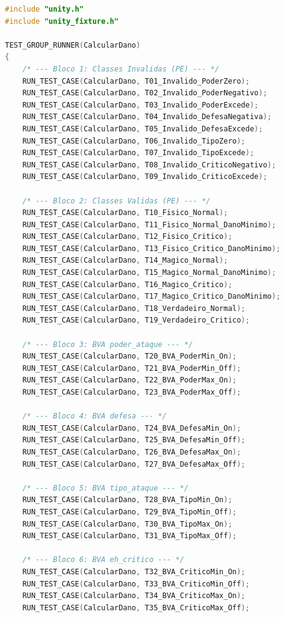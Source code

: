 \documentclass[conference, onecolumn]{IEEEtran}
\begin{document}
\begin{lstlisting}[language=C, caption={TestCalcularDano\_Runner.c --- registra os 47 casos no grupo Unity.}]
#include "unity.h"
#include "unity_fixture.h"

TEST_GROUP_RUNNER(CalcularDano)
{
    /* --- Bloco 1: Classes Invalidas (PE) --- */
    RUN_TEST_CASE(CalcularDano, T01_Invalido_PoderZero);
    RUN_TEST_CASE(CalcularDano, T02_Invalido_PoderNegativo);
    RUN_TEST_CASE(CalcularDano, T03_Invalido_PoderExcede);
    RUN_TEST_CASE(CalcularDano, T04_Invalido_DefesaNegativa);
    RUN_TEST_CASE(CalcularDano, T05_Invalido_DefesaExcede);
    RUN_TEST_CASE(CalcularDano, T06_Invalido_TipoZero);
    RUN_TEST_CASE(CalcularDano, T07_Invalido_TipoExcede);
    RUN_TEST_CASE(CalcularDano, T08_Invalido_CriticoNegativo);
    RUN_TEST_CASE(CalcularDano, T09_Invalido_CriticoExcede);

    /* --- Bloco 2: Classes Validas (PE) --- */
    RUN_TEST_CASE(CalcularDano, T10_Fisico_Normal);
    RUN_TEST_CASE(CalcularDano, T11_Fisico_Normal_DanoMinimo);
    RUN_TEST_CASE(CalcularDano, T12_Fisico_Critico);
    RUN_TEST_CASE(CalcularDano, T13_Fisico_Critico_DanoMinimo);
    RUN_TEST_CASE(CalcularDano, T14_Magico_Normal);
    RUN_TEST_CASE(CalcularDano, T15_Magico_Normal_DanoMinimo);
    RUN_TEST_CASE(CalcularDano, T16_Magico_Critico);
    RUN_TEST_CASE(CalcularDano, T17_Magico_Critico_DanoMinimo);
    RUN_TEST_CASE(CalcularDano, T18_Verdadeiro_Normal);
    RUN_TEST_CASE(CalcularDano, T19_Verdadeiro_Critico);

    /* --- Bloco 3: BVA poder_ataque --- */
    RUN_TEST_CASE(CalcularDano, T20_BVA_PoderMin_On);
    RUN_TEST_CASE(CalcularDano, T21_BVA_PoderMin_Off);
    RUN_TEST_CASE(CalcularDano, T22_BVA_PoderMax_On);
    RUN_TEST_CASE(CalcularDano, T23_BVA_PoderMax_Off);

    /* --- Bloco 4: BVA defesa --- */
    RUN_TEST_CASE(CalcularDano, T24_BVA_DefesaMin_On);
    RUN_TEST_CASE(CalcularDano, T25_BVA_DefesaMin_Off);
    RUN_TEST_CASE(CalcularDano, T26_BVA_DefesaMax_On);
    RUN_TEST_CASE(CalcularDano, T27_BVA_DefesaMax_Off);

    /* --- Bloco 5: BVA tipo_ataque --- */
    RUN_TEST_CASE(CalcularDano, T28_BVA_TipoMin_On);
    RUN_TEST_CASE(CalcularDano, T29_BVA_TipoMin_Off);
    RUN_TEST_CASE(CalcularDano, T30_BVA_TipoMax_On);
    RUN_TEST_CASE(CalcularDano, T31_BVA_TipoMax_Off);

    /* --- Bloco 6: BVA eh_critico --- */
    RUN_TEST_CASE(CalcularDano, T32_BVA_CriticoMin_On);
    RUN_TEST_CASE(CalcularDano, T33_BVA_CriticoMin_Off);
    RUN_TEST_CASE(CalcularDano, T34_BVA_CriticoMax_On);
    RUN_TEST_CASE(CalcularDano, T35_BVA_CriticoMax_Off);


\end{lstlisting}
\end{document}
